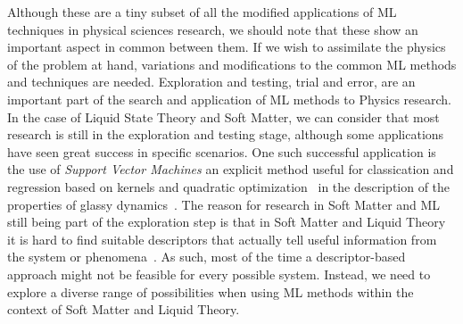 Although these are a tiny subset of all the modified applications of ML techniques
in physical sciences research, we should note that these show an important aspect
in common between them. If we wish to assimilate the physics of the problem at hand,
variations and modifications to the common ML methods and techniques are needed. 
Exploration and testing, trial and error, are an important part of the search and 
application of ML methods to Physics research. In the case of Liquid State Theory and Soft 
Matter, we can consider that most research is still in the exploration and testing stage,
although some applications have seen great success in specific scenarios.
One such successful application is the use of \emph{Support Vector Machines}\textemdash
an explicit method useful for classication and regression based on kernels and
quadratic optimization~\cite{steinwartSupportVectorMachines2008}\textemdash
in the description of the properties of glassy dynamics~\cite{schoenholzStructuralApproachRelaxation2016}.
The reason for research in Soft Matter and ML still being part of the exploration step is 
that in Soft Matter and Liquid Theory it is hard to find suitable descriptors that 
actually tell useful information from the system or phenomena~\cite{dijkstraPredictiveModellingMachine2021a}.
As such, most of the time a descriptor-based approach might not be feasible for every 
possible system. Instead, we need to explore a diverse range of possibilities when using ML 
methods within the context of Soft Matter and Liquid Theory.


